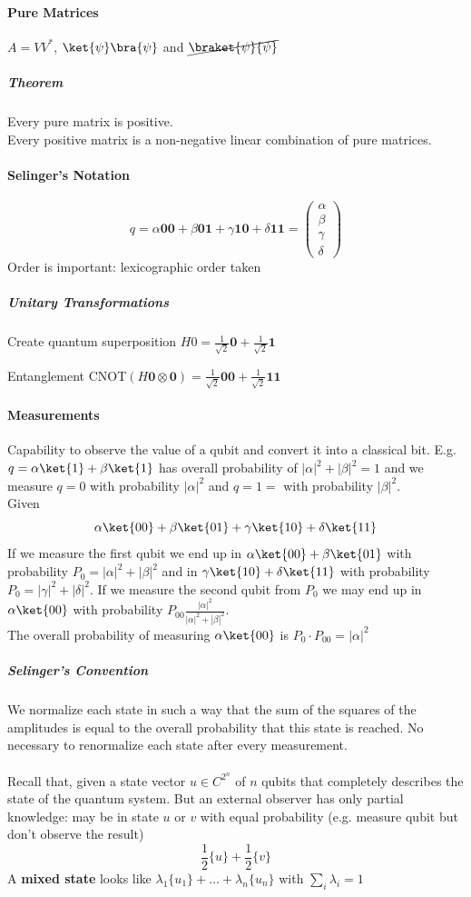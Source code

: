 \documentclass[10pt]{report}
\begin{document}
\paragraph{Pure Matrices} $A = VV^*$, $\ket{\psi}\bra{\psi}$ and $\cancel{\braket{\psi}{\psi}}$
\subparagraph{Theorem} Every pure matrix is positive.\\
Every positive matrix is a non-negative linear combination of pure matrices.
\paragraph{Selinger's Notation}
$$q = \alpha\mathbf{00} + \beta\mathbf{01} + \gamma\mathbf{10} + \delta\mathbf{11} = \left(\begin{array}{c}
\alpha\\\beta\\\gamma\\\delta
\end{array}\right)$$
Order is important: lexicographic order taken
\subparagraph{Unitary Transformations}
\begin{list}{}{}
	\item Create quantum superposition $H0 = \frac{1}{\sqrt{2}}\mathbf{0} + \frac{1}{\sqrt{2}}\mathbf{1}$
	\item Entanglement CNOT$(H\mathbf{0}\otimes\mathbf{0})=\frac{1}{\sqrt{2}}\mathbf{00}+\frac{1}{\sqrt{2}}\mathbf{11}$
\end{list}
\paragraph{Measurements} Capability to observe the value of a qubit and convert it into a classical bit. E.g. $q = \alpha\ket{1}+\beta\ket{1}$ has overall probability of $|\alpha|^2+|\beta|^2=1$ and we measure $q=0$ with probability $|\alpha|^2$ and $q=1=$ with probability $|\beta|^2$.\\
Given 
$$\alpha\ket{00}+\beta\ket{01}+\gamma\ket{10}+\delta\ket{11}$$
If we measure the first qubit we end up in $\alpha\ket{00}+\beta\ket{01}$ with probability $P_0=|\alpha|^2+|\beta|^2$ and in $\gamma\ket{10}+\delta\ket{11}$ with probability $P_0=|\gamma|^2+|\delta|^2$. If we measure the second qubit from $P_0$ we may end up in $\alpha\ket{00}$ with probability $P_{00}\frac{|\alpha|^2}{|\alpha|^2+|\beta|^2}$.\\
The overall probability of measuring $\alpha\ket{00}$ is $P_{0}\cdot P_{00} = |\alpha|^2$
\subparagraph{Selinger's Convention} We normalize each state in such a way that the sum of the squares of the amplitudes is equal to the overall probability that this state is reached. No necessary to renormalize each state after every measurement.\\\\
Recall that, given a state vector $u\in C^{2^n}$ of $n$ qubits that completely describes the state of the quantum system. But an external observer has only partial knowledge: may be in state $u$ or $v$ with equal probability (e.g. measure qubit but don't observe the result)
$$\frac{1}{2}\{u\}+\frac{1}{2}\{v\}$$
A \textbf{mixed state} looks like $\lambda_1\{u_1\}+\ldots+\lambda_n\{u_n\}$ with $\sum_i \lambda_i = 1$
\end{document}
